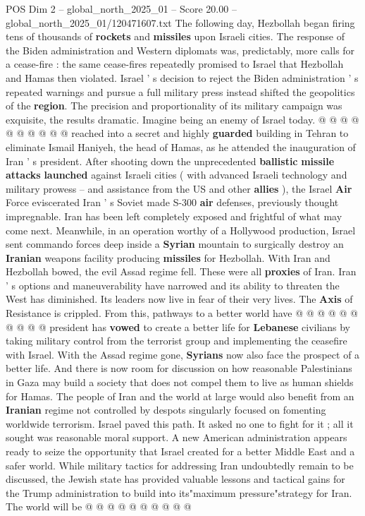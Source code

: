\begin{textsample}{POS Dim 2 – global\_north\_2025\_01 – Score 20.00 – global\_north\_2025\_01/120471607.txt}
The following day, Hezbollah began firing tens of thousands of \textbf{rockets} and \textbf{missiles} upon Israeli cities.
The response of the Biden administration and Western diplomats was, predictably, more calls for a cease-fire : the same cease-fires repeatedly promised to Israel that Hezbollah and Hamas then violated.
Israel ' s decision to reject the Biden administration ' s repeated warnings and pursue a full military press instead shifted the geopolitics of the \textbf{region}.
The precision and proportionality of its military campaign was exquisite, the results dramatic.
Imagine being an enemy of Israel today. @ @ @ @ @ @ @ @ @ @ reached into a secret and highly \textbf{guarded} building in Tehran to eliminate Ismail Haniyeh, the head of Hamas, as he attended the inauguration of Iran ' s president.
After shooting down the unprecedented \textbf{ballistic} \textbf{missile} \textbf{attacks} \textbf{launched} against Israeli cities ( with advanced Israeli technology and military prowess -- and assistance from the US and other \textbf{allies} ), the Israel \textbf{Air} Force eviscerated Iran ' s Soviet made S-300 \textbf{air} defenses, previously thought impregnable.
Iran has been left completely exposed and frightful of what may come next.
Meanwhile, in an operation worthy of a Hollywood production, Israel sent commando forces deep inside a \textbf{Syrian} mountain to surgically destroy an \textbf{Iranian} weapons facility producing \textbf{missiles} for Hezbollah.
With Iran and Hezbollah bowed, the evil Assad regime fell.
These were all \textbf{proxies} of Iran.
Iran ' s options and maneuverability have narrowed and its ability to threaten the West has diminished.
Its leaders now live in fear of their very lives.
The \textbf{Axis} of Resistance is crippled.
From this, pathways to a better world have @ @ @ @ @ @ @ @ @ @ president has \textbf{vowed} to create a better life for \textbf{Lebanese} civilians by taking military control from the terrorist group and implementing the ceasefire with Israel.
With the Assad regime gone, \textbf{Syrians} now also face the prospect of a better life.
And there is now room for discussion on how reasonable Palestinians in Gaza may build a society that does not compel them to live as human shields for Hamas.
The people of Iran and the world at large would also benefit from an \textbf{Iranian} regime not controlled by despots singularly focused on fomenting worldwide terrorism.
Israel paved this path.
It asked no one to fight for it ; all it sought was reasonable moral support.
A new American administration appears ready to seize the opportunity that Israel created for a better Middle East and a safer world.
While military tactics for addressing Iran undoubtedly remain to be discussed, the Jewish state has provided valuable lessons and tactical gains for the Trump administration to build into its"maximum pressure"strategy for Iran.
The world will be @ @ @ @ @ @ @ @ @ @

\end{textsample}
